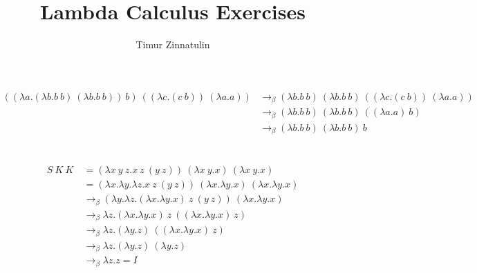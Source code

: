 \documentclass[12pt]{article}
\title{Lambda Calculus Exercises}
\author{Timur Zinnatulin}
\date{}
\begin{document}
\maketitle

\begin{align*}
((\lambda a.(\lambda b.b\ b)\ (\lambda b.b\ b ))\ b)\ ((\lambda c.(c\ b))\ (\lambda a.a)) 
& \longrightarrow_\beta (\lambda b.b\ b)\ (\lambda b.b\ b )\ ((\lambda c.(c \ b))\ (\lambda a.a)) \\
& \longrightarrow_\beta (\lambda b.b\ b)\ (\lambda b.b\ b )\ ((\lambda a.a)\ b) \\
& \longrightarrow_\beta (\lambda b.b\ b)\ (\lambda b.b\ b )\ b
\end{align*}
\\
\\
\begin{align*}
S\ K\ K\ & = (\lambda x\ y\ z.x\ z\ (y\ z))\ (\lambda x\ y.x)\ (\lambda x\ y.x) \\
& = (\lambda x.\lambda y.\lambda z.x\ z\ (y\ z))\ (\lambda x.\lambda y.x)\ (\lambda x. \lambda y.x) \\
& \longrightarrow_\beta (\lambda y.\lambda z.(\lambda x.\lambda y.x)\ z\ (y\ z))\ (\lambda x.\lambda y.x) \\
& \longrightarrow_\beta \lambda z.(\lambda x.\lambda y.x)\ z\ ((\lambda x.\lambda y.x)\ z) \\
& \longrightarrow_\beta \lambda z.(\lambda y.z)\ ((\lambda x.\lambda y.x)\ z) \\ 
& \longrightarrow_\beta \lambda z.(\lambda y.z)\ (\lambda y.z) \\ 
& \longrightarrow_\beta \lambda z.z = I
\end{align*}
\end{document}
